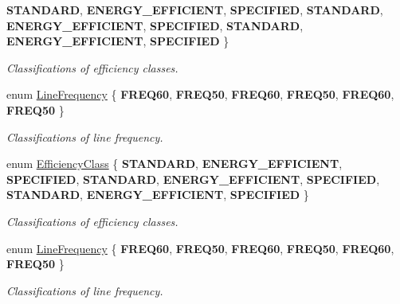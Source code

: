 \begin{DoxyCompactItemize}
{\bfseries S\+T\+A\+N\+D\+A\+RD}, 
{\bfseries E\+N\+E\+R\+G\+Y\+\_\+\+E\+F\+F\+I\+C\+I\+E\+NT}, 
{\bfseries S\+P\+E\+C\+I\+F\+I\+ED}, 
{\bfseries S\+T\+A\+N\+D\+A\+RD}, 
\newline
{\bfseries E\+N\+E\+R\+G\+Y\+\_\+\+E\+F\+F\+I\+C\+I\+E\+NT}, 
{\bfseries S\+P\+E\+C\+I\+F\+I\+ED}, 
{\bfseries S\+T\+A\+N\+D\+A\+RD}, 
{\bfseries E\+N\+E\+R\+G\+Y\+\_\+\+E\+F\+F\+I\+C\+I\+E\+NT}, 
\newline
{\bfseries S\+P\+E\+C\+I\+F\+I\+ED}
 \}\begin{DoxyCompactList}\small\item\em Classifications of efficiency classes. \end{DoxyCompactList}
\item 
\mbox{\label{class_motor_acee1bdf1b684ad36cb80dc2829d9fcee}} 
enum \hyperlink{class_motor_acee1bdf1b684ad36cb80dc2829d9fcee}{Line\+Frequency} \{ \newline
{\bfseries F\+R\+E\+Q60}, 
{\bfseries F\+R\+E\+Q50}, 
{\bfseries F\+R\+E\+Q60}, 
{\bfseries F\+R\+E\+Q50}, 
\newline
{\bfseries F\+R\+E\+Q60}, 
{\bfseries F\+R\+E\+Q50}
 \}\begin{DoxyCompactList}\small\item\em Classifications of line frequency. \end{DoxyCompactList}
\item 
\mbox{\label{class_motor_afa022971ae062406a9f588c601673d4e}} 
enum \hyperlink{class_motor_afa022971ae062406a9f588c601673d4e}{Efficiency\+Class} \{ \newline
{\bfseries S\+T\+A\+N\+D\+A\+RD}, 
{\bfseries E\+N\+E\+R\+G\+Y\+\_\+\+E\+F\+F\+I\+C\+I\+E\+NT}, 
{\bfseries S\+P\+E\+C\+I\+F\+I\+ED}, 
{\bfseries S\+T\+A\+N\+D\+A\+RD}, 
\newline
{\bfseries E\+N\+E\+R\+G\+Y\+\_\+\+E\+F\+F\+I\+C\+I\+E\+NT}, 
{\bfseries S\+P\+E\+C\+I\+F\+I\+ED}, 
{\bfseries S\+T\+A\+N\+D\+A\+RD}, 
{\bfseries E\+N\+E\+R\+G\+Y\+\_\+\+E\+F\+F\+I\+C\+I\+E\+NT}, 
\newline
{\bfseries S\+P\+E\+C\+I\+F\+I\+ED}
 \}\begin{DoxyCompactList}\small\item\em Classifications of efficiency classes. \end{DoxyCompactList}
\item 
\mbox{\label{class_motor_acee1bdf1b684ad36cb80dc2829d9fcee}} 
enum \hyperlink{class_motor_acee1bdf1b684ad36cb80dc2829d9fcee}{Line\+Frequency} \{ \newline
{\bfseries F\+R\+E\+Q60}, 
{\bfseries F\+R\+E\+Q50}, 
{\bfseries F\+R\+E\+Q60}, 
{\bfseries F\+R\+E\+Q50}, 
\newline
{\bfseries F\+R\+E\+Q60}, 
{\bfseries F\+R\+E\+Q50}
 \}\begin{DoxyCompactList}\small\item\em Classifications of line frequency. \end{DoxyCompactList}
\end{DoxyCompactItemize}
